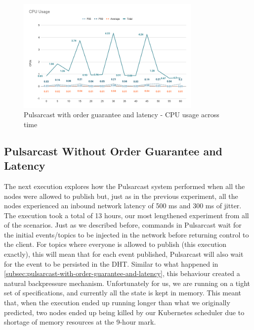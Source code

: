 \begin{figure}[!htb]
  \centering
  \includegraphics[width=0.8\textwidth]{img/graph-pulsarcast-order-latency-cpu.png}
  \caption{Pulsarcast with order guarantee and latency - CPU usage across time}
  \label{fig:graph-pulsarcast-order-latency-cpu}
\end{figure}

\subsection{Pulsarcast Without Order Guarantee and Latency}\label{subsec:pulsarcast-without-order-guarantee-and-latency}

The next execution explores how the Pulsarcast system performed when all the
nodes were allowed to publish but, just as in the previous experiment, all the
nodes experienced an inbound network latency of 500 ms and 300 ms of jitter.
The execution took a total of 13 hours, our most lengthened experiment from all
of the scenarios. Just as we described before, commands in Pulsarcast wait for
the initial events/topics to be injected in the network before returning
control to the client. For topics where everyone is allowed to publish (this
execution exactly), this will mean that for each event published, Pulsarcast
will also wait for the event to be persisted in the DHT. Similar to what
happened in \ref{subsec:pulsarcast-with-order-guarantee-and-latency}, this
behaviour created a natural backpressure mechanism. Unfortunately for us, we
are running on a tight set of specifications, and currently all the state is
kept in memory. This meant that, when the execution ended up running longer
than what we originally predicted, two nodes ended up being killed by our
Kubernetes scheduler due to shortage of memory resources at the 9-hour mark.

